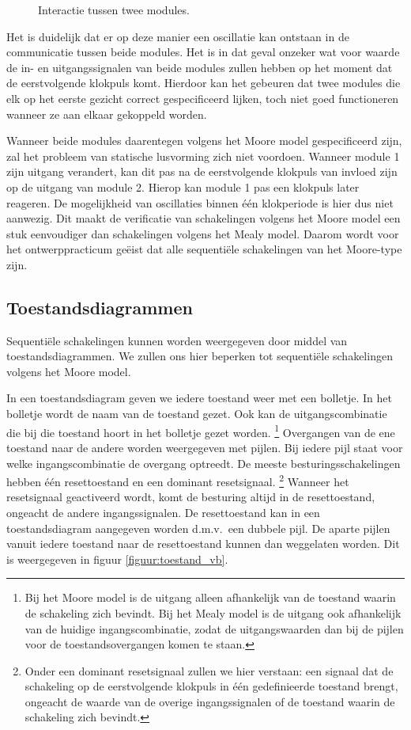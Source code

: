 \begin{figure}[bth]
\centerline{}
\caption{Interactie tussen twee modules.}
\label{figuur:modules}
\end{figure}

Het is duidelijk dat er op deze manier een oscillatie kan ontstaan
in de communicatie tussen beide modules.
Het is in dat geval onzeker wat voor waarde de in- en uitgangssignalen
van beide modules zullen hebben op het moment dat de 
eerstvolgende klokpuls komt.
Hierdoor kan het gebeuren dat twee modules die elk op het eerste gezicht
correct gespecificeerd lijken, toch niet goed functioneren
wanneer ze aan elkaar gekoppeld worden.

Wanneer beide modules daarentegen volgens het Moore model gespecificeerd
zijn, zal het probleem van statische lusvorming zich niet voordoen.
Wanneer module 1 zijn uitgang verandert, kan dit pas na de eerstvolgende klokpuls
van invloed zijn op de uitgang van module 2.
Hierop kan module 1 pas een klokpuls later reageren.
De mogelijkheid van oscillaties binnen \'e\'en klokperiode is hier dus niet
aanwezig.
Dit maakt de verificatie van schakelingen volgens het Moore model een stuk
eenvoudiger dan schakelingen volgens het Mealy model.
Daarom wordt voor het ontwerppracticum ge\"eist dat alle
sequenti\"ele schakelingen van het Moore-type zijn. 
 
\subsection{Toestandsdiagrammen}

Sequenti\"ele schakelingen kunnen worden weergegeven door middel van
toestandsdiagrammen.
We zullen ons hier beperken tot sequenti\"ele schakelingen volgens het Moore model.

In een toestandsdiagram geven we iedere toestand weer met een bolletje.
In het bolletje wordt de naam van de toestand gezet. Ook kan de uitgangscombinatie
die bij die toestand hoort in het bolletje gezet worden.
\footnote{Bij het Moore model is de uitgang alleen afhankelijk van de
toestand waarin de schakeling zich bevindt.
Bij het Mealy model is de uitgang ook afhankelijk van de huidige
ingangscombinatie, zodat de uitgangswaarden dan
bij de pijlen voor de toestandsovergangen komen te staan.}
Overgangen van de ene toestand naar de andere worden weergegeven met pijlen.
Bij iedere pijl staat voor welke ingangscombinatie de overgang optreedt.
De meeste besturingsschakelingen hebben \'e\'en resettoestand
en een dominant resetsignaal.
\footnote{Onder een dominant resetsignaal zullen we hier verstaan: een
signaal dat de schakeling op de eerstvolgende klokpuls in \'e\'en
gedefinieerde toestand brengt, ongeacht de waarde van de overige 
ingangssignalen of de toestand waarin de schakeling zich bevindt.}
Wanneer het resetsignaal geactiveerd wordt, komt de besturing
altijd in de resettoestand, ongeacht de andere ingangssignalen.
De resettoestand kan in een toestandsdiagram aangegeven worden
d.m.v.\ een dubbele pijl.
De aparte pijlen vanuit iedere toestand naar de resettoestand kunnen
dan weggelaten worden.
Dit is weergegeven in figuur \ref{figuur:toestand_vb}.

